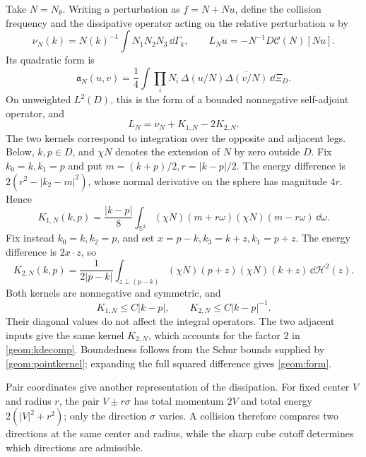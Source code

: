 Take $N=N_\theta$. Writing a perturbation as $f=N+Nu$, define the collision
frequency and the dissipative operator acting on the relative perturbation $u$ by
\begin{equation}\label{geom:linear}
 \nu_N(k)=N(k)^{-1}\int N_1N_2N_3\,\dd\Gamma_k,
 \qquad L_Nu=-N^{-1}D\mathcal C(N)[Nu].
\end{equation}
Its quadratic form is
\begin{equation}\label{geom:form}
 \mathfrak a_N(u,v)=\frac14\int\prod_iN_i\,
       \Delta(u/N)\overline{\Delta(v/N)}\,\dd\Xi_D.
\end{equation}
On unweighted $L^2(D)$, this is the form of a bounded nonnegative
self-adjoint operator, and
\begin{equation}\label{geom:kdecomp}
 L_N=\nu_N+K_{1,N}-2K_{2,N}.
\end{equation}
The two kernels correspond to integration over the opposite and adjacent legs.
Below, $k,p\in D$, and $\chi N$ denotes the extension of $N$ by zero outside $D$.
Fix $k_0=k,k_1=p$ and put $m=(k+p)/2,r=|k-p|/2$. The energy difference is
$2(r^2-|k_2-m|^2)$, whose normal derivative on the sphere has magnitude
$4r$. Hence
\begin{equation}\label{geom:k1}
 K_{1,N}(k,p)=\frac{|k-p|}{8}\int_{\mathbb S^2}
       (\chi N)(m+r\omega)(\chi N)(m-r\omega)\,\dd\omega.
\end{equation}
Fix instead $k_0=k,k_2=p$, and set $x=p-k,k_3=k+z,k_1=p+z$.
The energy difference is $2x\cdot z$, so
\begin{equation}\label{geom:k2}
 K_{2,N}(k,p)=\frac1{2|p-k|}\int_{z\perp(p-k)}
       (\chi N)(p+z)(\chi N)(k+z)\,\dd\mathcal H^2(z).
\end{equation}
Both kernels are nonnegative and symmetric, and
\begin{equation}\label{geom:pointkernel}
 K_{1,N}\le C|k-p|,\qquad K_{2,N}\le C|k-p|^{-1}.
\end{equation}
Their diagonal values do not affect the integral operators. The two adjacent
inputs give the same kernel $K_{2,N}$, which accounts for the factor $2$
in \eqref{geom:kdecomp}. Boundedness follows from the Schur bounds supplied
by \eqref{geom:pointkernel}; expanding the full squared difference gives
\eqref{geom:form}.

Pair coordinates give another representation of the dissipation.
For fixed center $V$ and radius $r$, the pair $V\pm r\sigma$ has total
momentum $2V$ and total energy $2(|V|^2+r^2)$; only the direction $\sigma$
varies. A collision therefore compares two directions at the same center
and radius, while the sharp cube cutoff determines which directions are admissible.

